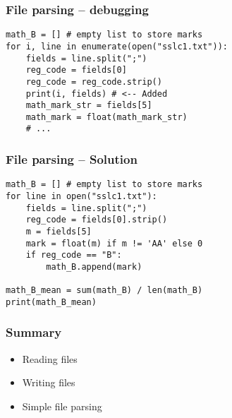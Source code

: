 \documentclass[14pt,compress]{beamer}
\begin{document}
\begin{frame}
  \frametitle{File parsing -- debugging}
  \begin{lstlisting}
math_B = [] # empty list to store marks
for i, line in enumerate(open("sslc1.txt")):
    fields = line.split(";")
    reg_code = fields[0]
    reg_code = reg_code.strip()
    print(i, fields) # <-- Added
    math_mark_str = fields[5]
    math_mark = float(math_mark_str)
    # ...
  \end{lstlisting}
\end{frame}


\begin{frame}
  \frametitle{File parsing -- Solution}
  \begin{lstlisting}
math_B = [] # empty list to store marks
for line in open("sslc1.txt"):
    fields = line.split(";")
    reg_code = fields[0].strip()
    m = fields[5]
    mark = float(m) if m != 'AA' else 0
    if reg_code == "B":
        math_B.append(mark)

math_B_mean = sum(math_B) / len(math_B)
print(math_B_mean)
  \end{lstlisting}
\end{frame}

\begin{frame}
  \frametitle{Summary}
  \begin{itemize}
  \item Reading files
  \item Writing files
  \item Simple file parsing
  \end{itemize}
\end{frame}
\end{document}
